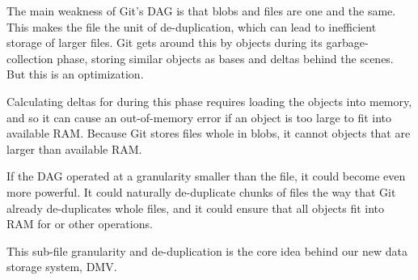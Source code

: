 The main weakness of Git's \gls{DAG} is that \glspl{blob} and files are one and
the same. This makes the file the unit of de-duplication, which can lead to
inefficient storage of larger files. Git gets around this by
 objects during its garbage-collection phase, storing
similar objects as bases and deltas behind the scenes. But this is an
optimization.

Calculating deltas for during this  phase requires
loading the objects into memory, and so it can cause an out-of-memory error if
an object is too large to fit into available RAM. Because Git stores files whole
in \glspl{blob}, it cannot  objects that are larger than
available RAM.

If the \gls{DAG} operated at a granularity smaller than the file, it could
become even more powerful. It could naturally de-duplicate chunks of files the
way that Git already de-duplicates whole files, and it could ensure that all
objects fit into RAM for  or other operations.

This sub-file granularity and de-duplication is the core idea behind our new
data storage system, \acrlong{DMV}.
